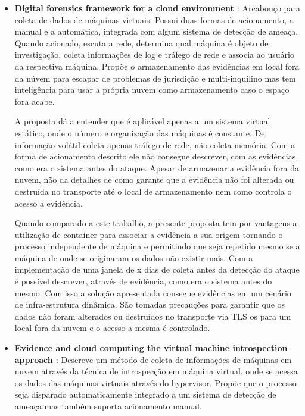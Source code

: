 \documentclass[
	12pt,				%
	openright,			%
	oneside,			%
	a4paper,			%
	english,			%
	french,				%
	spanish,			%
	brazil,				%
	]{abntex2}
\begin{document}
\begin{itemize}

\item \textbf{Digital forensics framework for a cloud environment \cite{George2012} }: Arcabouço para coleta de dados de máquinas virtuais. Possui duas formas de 
acionamento, a manual e a automática, integrada com algum sistema de detecção de ameaça. Quando acionado, escuta a rede, determina qual máquina é objeto de investigação, 
coleta informações de log e tráfego de rede e associa ao usuário da respectiva máquina. Propõe o armazenamento das evidências em local fora da núvem para escapar de 
problemas de jurisdição e multi-inquilino mas tem inteligência para usar a própria nuvem como armazenamento caso o espaço fora acabe.

A proposta dá a entender que é aplicável apenas a um sistema virtual estático, onde o número e organização das máquinas é constante. De informação volátil coleta apenas 
tráfego de rede, não coleta memória. Com a forma de acionamento descrito ele não consegue descrever, com as evidências, como era o sistema antes do ataque. Apesar de armazenar 
a evidência fora da nuvem, não da detalhes de como garante que a evidência não foi alterada ou destruída no transporte até o local de armazenamento nem como controla o 
acesso a evidência.

Quando comparado a este trabalho, a presente proposta tem por vantagens a utilização de container para associar a evidência a sua origem tornando o processo independente 
de máquina e permitindo que seja repetido mesmo se a máquina de onde se originaram os dados não existir mais. Com a implementação de uma janela de x dias de coleta antes da
detecção do ataque é possível descrever, através de evidência, como era o sistema antes do mesmo. Com isso a solução apresentada consegue evidências em um cenário de
infra-estrutura dinâmica. São tomadas precauções para garantir que os dados não foram alterados ou destruídos no transporte via TLS os para um local fora da nuvem e 
o acesso a mesma é controlado.\\
 
\item \textbf{Evidence and cloud computing the virtual machine introspection approach \cite{Poisel2013} }: Descreve um método de coleta de informações de máquinas
em nuvem através da técnica de introspecção em máquina virtual, onde se acessa os dados das máquinas virtuais através do hypervisor. Propõe que o processo seja disparado
automaticamente integrado a um sistema de detecção de ameaça mas também suporta acionamento manual.


\end{itemize}
\end{document}
